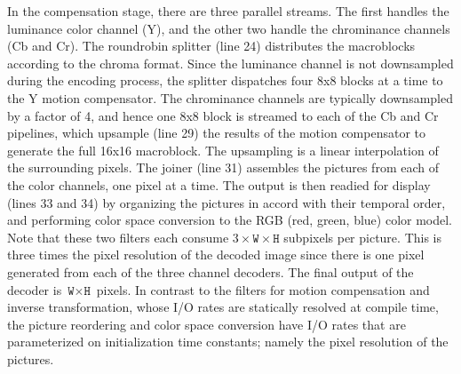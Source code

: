 In the compensation stage, there are three parallel streams.  The
first handles the luminance color channel (Y), and the other two
handle the chrominance channels (Cb and Cr). The roundrobin splitter
(line 24) distributes the macroblocks according to the chroma
format. Since the luminance channel is not downsampled during the
encoding process, the splitter dispatches four 8x8 blocks at a time to
the Y motion compensator. The chrominance channels are typically
downsampled by a factor of 4, and hence one 8x8 block is streamed to
each of the Cb and Cr pipelines, which upsample (line 29) the results
of the motion compensator to generate the full 16x16 macroblock.  The
upsampling is a linear interpolation of the surrounding pixels.
The joiner (line 31) assembles the pictures from each of the color
channels, one pixel at a time.  The output is then readied for display
(lines 33 and 34) by organizing the pictures in accord with their
temporal order, and performing color space conversion to the RGB (red,
green, blue) color model. Note that these two filters each consume
$3\times\texttt{W}\times\texttt{H}$ subpixels per picture. This is
three times the pixel resolution of the decoded image since there is
one pixel generated from each of the three channel decoders. The final
output of the decoder is $\texttt{W}\times\texttt{H}$ pixels.  In
contrast to the filters for motion compensation and inverse transformation,
whose I/O rates are statically resolved at compile time, the picture 
reordering and color space conversion have I/O rates that are
parameterized on initialization time constants; namely the pixel
resolution of the pictures.


